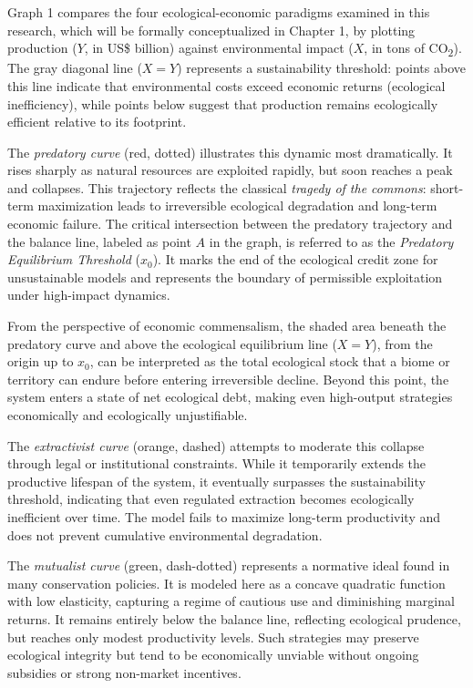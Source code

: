 Graph 1 compares the four ecological-economic paradigms examined in this research, which will be formally conceptualized in Chapter 1, by plotting production ($Y$, in US\$ billion) against environmental impact ($X$, in tons of CO\textsubscript{2}). The gray diagonal line ($X = Y$) represents a sustainability threshold: points above this line indicate that environmental costs exceed economic returns (ecological inefficiency), while points below suggest that production remains ecologically efficient relative to its footprint.

The \textit{predatory curve} (red, dotted) illustrates this dynamic most dramatically. It rises sharply as natural resources are exploited rapidly, but soon reaches a peak and collapses. This trajectory reflects the classical \textit{tragedy of the commons}: short-term maximization leads to irreversible ecological degradation and long-term economic failure. The critical intersection between the predatory trajectory and the balance line, labeled as point $A$ in the graph, is referred to as the \textit{Predatory Equilibrium Threshold} ($x_0$). It marks the end of the ecological credit zone for unsustainable models and represents the boundary of permissible exploitation under high-impact dynamics.

From the perspective of economic commensalism, the shaded area beneath the predatory curve and above the ecological equilibrium line ($X = Y$), from the origin up to $x_0$, can be interpreted as the total ecological stock that a biome or territory can endure before entering irreversible decline. Beyond this point, the system enters a state of net ecological debt, making even high-output strategies economically and ecologically unjustifiable.

The \textit{extractivist curve} (orange, dashed) attempts to moderate this collapse through legal or institutional constraints. While it temporarily extends the productive lifespan of the system, it eventually surpasses the sustainability threshold, indicating that even regulated extraction becomes ecologically inefficient over time. The model fails to maximize long-term productivity and does not prevent cumulative environmental degradation.

The \textit{mutualist curve} (green, dash-dotted) represents a normative ideal found in many conservation policies. It is modeled here as a concave quadratic function with low elasticity, capturing a regime of cautious use and diminishing marginal returns. It remains entirely below the balance line, reflecting ecological prudence, but reaches only modest productivity levels. Such strategies may preserve ecological integrity but tend to be economically unviable without ongoing subsidies or strong non-market incentives.

